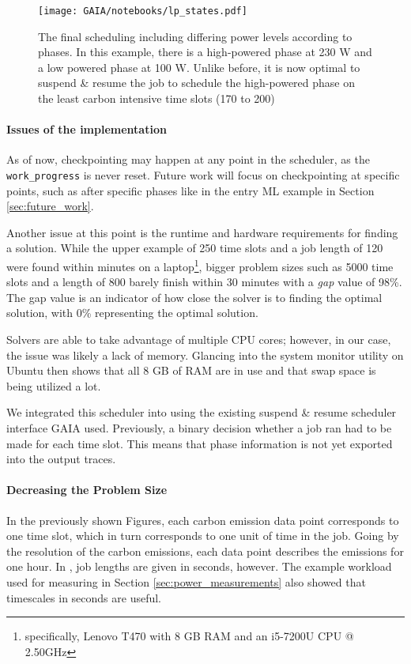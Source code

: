 \begin{figure}
    \texttt{[image: GAIA/notebooks/lp\_states.pdf]}
    \caption{The final scheduling including differing power levels according to phases. In this example, there is a high-powered phase at 230 W and a low powered phase at 100 W. Unlike before, it is now optimal to suspend \& resume the job to schedule the high-powered phase on the least carbon intensive time slots (170 to 200)}
    \label{fig:lp_states}
\end{figure}

\paragraph{Issues of the implementation}

As of now, checkpointing may happen at any point in the scheduler, as the \verb|work_progress| is never reset. 
Future work will focus on checkpointing at specific points, such as after specific phases like in the entry ML example in Section \ref{sec:future_work}.

Another issue at this point is the runtime and hardware requirements for finding a solution.
While the upper example of 250 time slots and a job length of 120 were found within minutes on a laptop\footnote{specifically, Lenovo T470 with 8 GB RAM and an i5-7200U CPU @ 2.50GHz}, bigger problem sizes such as 5000 time slots and a length of 800 barely finish within 30 minutes with a \emph{gap} value of 98\%.
The gap value is an indicator of how close the solver is to finding the optimal solution, with 0\% representing the optimal solution.

Solvers are able to take advantage of multiple CPU cores; however, in our case, the issue was likely a lack of memory. 
Glancing into the system monitor utility on Ubuntu then shows that all 8 GB of RAM are in use and that swap space is being utilized a lot.

We integrated this scheduler into \programname{} using the existing suspend \& resume scheduler interface GAIA used.
Previously, a binary decision whether a job ran had to be made for each time slot.
This means that phase information is not yet exported into the output traces.

\paragraph{Decreasing the Problem Size}

In the previously shown Figures, each carbon emission data point corresponds to one time slot, which in turn corresponds to one unit of time in the job. 
Going by the resolution of the carbon emissions, each data point describes the emissions for one hour. 
In \programname{}, job lengths are given in seconds, however. 
The example workload used for measuring in Section \ref{sec:power_measurements} also showed that timescales in seconds are useful. 

